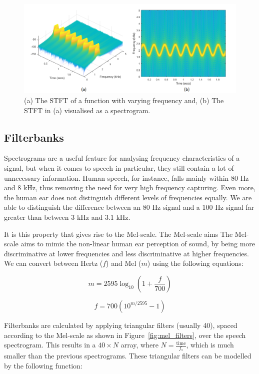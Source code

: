 \begin{figure}[h]
    \centering
    \includegraphics[width=0.9\linewidth]{content/fig/spec_example.png}
    \caption{
    (a) The STFT of a function with varying frequency and, 
    (b) The STFT in (a) visualised as a spectrogram.
    }
    \label{fig:spec_example}
\end{figure}

\subsection{Filterbanks}

Spectrograms are a useful feature for analysing frequency characteristics of a signal, but when it comes to speech in particular, they still contain a lot of unnecessary information. 
Human speech, for instance, falls mainly within 80 Hz and 8 kHz, thus removing the need for very high frequency capturing. 
Even more, the human ear does not distinguish different levels of frequencies equally. 
We are able to distinguish the difference between an 80 Hz signal and a 100 Hz signal far greater than between 3 kHz and 3.1 kHz.

It is this property that gives rise to the Mel-scale. 
The Mel-scale aims The Mel-scale aims to mimic the non-linear human ear perception of sound, by being more discriminative at lower frequencies and less discriminative at higher frequencies. 
We can convert between Hertz ($f$) and Mel ($m$) using the following equations:

\begin{equation}
    m = 2595 \log_{10} (1 + \frac{f}{700})
\end{equation}

\begin{equation}
    f = 700 (10^{m/2595} - 1)
\end{equation}

Filterbanks are calculated by applying triangular filters (usually 40), spaced according to the Mel-scale as shown in Figure~\ref{fig:mel_filters}, over the speech spectrogram. 
This results in a $40\times N$ array, where $N = \frac{\mathrm{time}}{f_s}$, which is much smaller than the previous spectrograms.
These triangular filters can be modelled by the following function:

